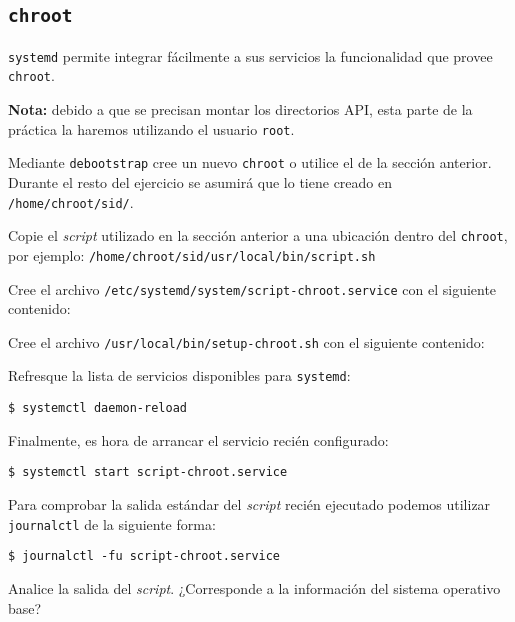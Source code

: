 \subsection{\texttt{chroot}}
\texttt{systemd} permite integrar fácilmente a sus servicios la
funcionalidad que provee \texttt{chroot}.

\textbf{Nota:} debido a que se precisan montar los directorios API, esta
parte de la práctica la haremos utilizando el usuario \texttt{root}.
\begin{questions}
  \question Mediante \texttt{debootstrap} cree un nuevo \texttt{chroot} o
  utilice el de la sección anterior. Durante el resto del ejercicio se
  asumirá que lo tiene creado en \texttt{/home/chroot/sid/}.

  \question Copie el \textit{script} utilizado en la sección anterior a una
  ubicación dentro del \texttt{chroot}, por ejemplo:
  \texttt{/home/chroot/sid/usr/local/bin/script.sh}

  \question Cree el archivo
  \texttt{/etc/systemd/system/script-chroot.service} con el siguiente
  contenido:

  

  \question Cree el archivo
  \texttt{/usr/local/bin/setup-chroot.sh} con el siguiente
  contenido:

  

  \question Refresque la lista de servicios disponibles para
  \texttt{systemd}:
  \begin{verbatim}
$ systemctl daemon-reload
\end{verbatim}

    \question Finalmente, es hora de arrancar el servicio recién configurado:
\begin{verbatim}
$ systemctl start script-chroot.service
\end{verbatim}

    \question Para comprobar la salida estándar del \textit{script} recién
    ejecutado podemos utilizar \texttt{journalctl} de la siguiente forma:
\begin{verbatim}
$ journalctl -fu script-chroot.service
\end{verbatim}

    Analice la salida del \textit{script}. ¿Corresponde a la información
    del sistema operativo base?   

\end{questions}

